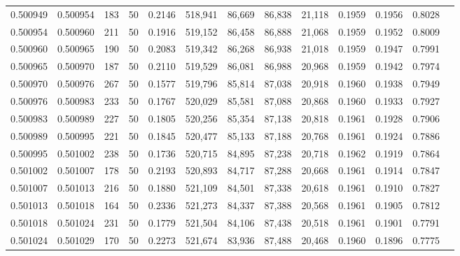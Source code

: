 \begin{tabular}{rrrrrrrrrrrrr}
0.500949 & 0.500954 & 183 &  50 &                                     0.2146 & 518,941 &  86,669 &  86,838 &  21,118 & 0.1959 & 0.1956 & 0.8028 \\
0.500954 & 0.500960 & 211 &  50 &                                     0.1916 & 519,152 &  86,458 &  86,888 &  21,068 & 0.1959 & 0.1952 & 0.8009 \\
0.500960 & 0.500965 & 190 &  50 &                                     0.2083 & 519,342 &  86,268 &  86,938 &  21,018 & 0.1959 & 0.1947 & 0.7991 \\
0.500965 & 0.500970 & 187 &  50 &                                     0.2110 & 519,529 &  86,081 &  86,988 &  20,968 & 0.1959 & 0.1942 & 0.7974 \\
0.500970 & 0.500976 & 267 &  50 &                                     0.1577 & 519,796 &  85,814 &  87,038 &  20,918 & 0.1960 & 0.1938 & 0.7949 \\
0.500976 & 0.500983 & 233 &  50 &                                     0.1767 & 520,029 &  85,581 &  87,088 &  20,868 & 0.1960 & 0.1933 & 0.7927 \\
0.500983 & 0.500989 & 227 &  50 &                                     0.1805 & 520,256 &  85,354 &  87,138 &  20,818 & 0.1961 & 0.1928 & 0.7906 \\
0.500989 & 0.500995 & 221 &  50 &                                     0.1845 & 520,477 &  85,133 &  87,188 &  20,768 & 0.1961 & 0.1924 & 0.7886 \\
0.500995 & 0.501002 & 238 &  50 &                                     0.1736 & 520,715 &  84,895 &  87,238 &  20,718 & 0.1962 & 0.1919 & 0.7864 \\
0.501002 & 0.501007 & 178 &  50 &                                     0.2193 & 520,893 &  84,717 &  87,288 &  20,668 & 0.1961 & 0.1914 & 0.7847 \\
0.501007 & 0.501013 & 216 &  50 &                                     0.1880 & 521,109 &  84,501 &  87,338 &  20,618 & 0.1961 & 0.1910 & 0.7827 \\
0.501013 & 0.501018 & 164 &  50 &                                     0.2336 & 521,273 &  84,337 &  87,388 &  20,568 & 0.1961 & 0.1905 & 0.7812 \\
0.501018 & 0.501024 & 231 &  50 &                                     0.1779 & 521,504 &  84,106 &  87,438 &  20,518 & 0.1961 & 0.1901 & 0.7791 \\
0.501024 & 0.501029 & 170 &  50 &                                     0.2273 & 521,674 &  83,936 &  87,488 &  20,468 & 0.1960 & 0.1896 & 0.7775 \\

\end{tabular}
